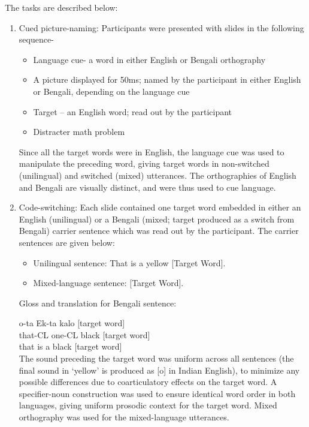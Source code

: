 \documentclass[charis,linguex]{glossa}
\begin{document}
The tasks are described below:


\begin{enumerate}[]
	\item Cued picture-naming: Participants were presented with slides in the following sequence-
	\begin{itemize}
		\item Language cue- a word in either English or Bengali orthography
		\item A picture displayed for 50ms; named by the participant in either English or Bengali, depending on the language cue 
		\item Target -- an English word; read out by the participant
		\item Distracter math problem
	\end{itemize}
	Since all the target words were in English, the language cue was used to manipulate the preceding word, giving target words in non-switched (unilingual) and switched (mixed) utterances. The orthographies of English and Bengali are visually distinct, and were thus used to cue language.
	
	\item Code-switching: Each slide contained one target word embedded in either an English (unilingual) or a Bengali (mixed; target produced as a switch from Bengali) carrier sentence which was read out by the participant. The carrier sentences are given below:
	\begin{itemize}
		\item Unilingual sentence: That is a yellow [Target Word].
		\item Mixed-language sentence:  [Target Word]. 
	\end{itemize}
	
Gloss and translation for Bengali sentence:

	o-ta \quad Ek-ta \quad kalo [target word]\\
	that-CL one-CL black [target word]\\
	that is a black [target word]\\

	The sound preceding the target word was uniform across all sentences (the final sound in `yellow' is produced as [o] in Indian English), to minimize any possible differences due to coarticulatory effects on the target word. A specifier-noun construction was used to ensure identical word order in both languages, giving uniform prosodic context for the target word. Mixed orthography was used for the mixed-language utterances. \\
	
\end{enumerate}
\end{document}
